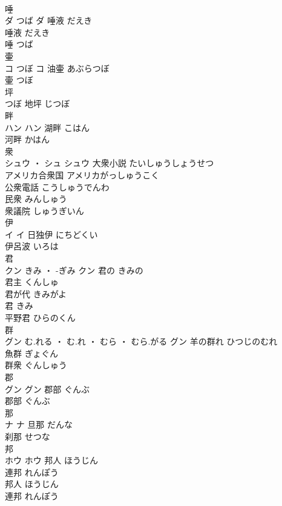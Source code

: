 \documentclass[8pt]{extreport}
\begin{document}
\begin{CJK}{UTF8}{min}
\\	唾	
\\	ダ	つば	ダ	唾液	だえき	
\\	唾液	だえき	
\\	唾	つば	
\\	壷	
\\	コ	つぼ	コ	油壷	あぶらつぼ	
\\	壷	つぼ	
\\	坪	
\\	つぼ														地坪	じつぼ	
\\	畔	
\\	ハン		ハン	湖畔	こはん	
\\	河畔	かはん	
\\	衆	
\\	シュウ ・ シュ		シュウ	大衆小説	たいしゅうしょうせつ	
\\	アメリカ合衆国	アメリカがっしゅうこく	
\\	公衆電話	こうしゅうでんわ	
\\	民衆	みんしゅう	
\\	衆議院	しゅうぎいん	
\\	伊	
\\	イ		イ	日独伊	にちどくい	
\\	伊呂波	いろは	
\\	君	
\\	クン	きみ ・ -ぎみ	クン	君の	きみの	
\\	君主	くんしゅ	
\\	君が代	きみがよ	
\\	君	きみ	
\\	平野君	ひらのくん	
\\	群	
\\	グン	む.れる ・ む.れ ・ むら ・ むら.がる	グン	羊の群れ	ひつじのむれ	
\\	魚群	ぎょぐん	
\\	群衆	ぐんしゅう	
\\	郡	
\\	グン		グン	郡部	ぐんぶ	
\\	郡部	ぐんぶ	
\\	那	
\\	ナ		ナ	旦那	だんな	
\\	刹那	せつな	
\\	邦	
\\	ホウ		ホウ	邦人	ほうじん	
\\	連邦	れんぽう	
\\	邦人	ほうじん	
\\	連邦	れんぽう	

\end{CJK}
\end{document}
